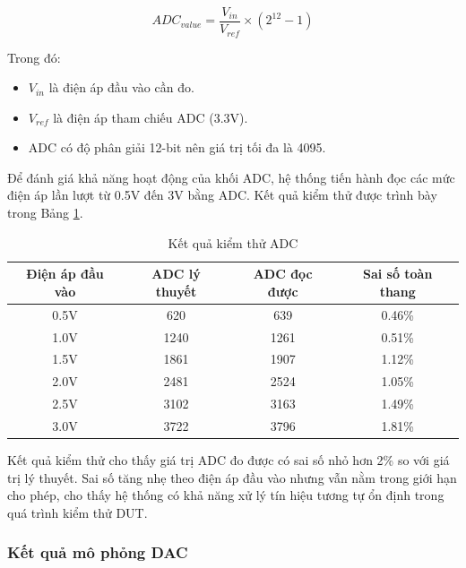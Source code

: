 \[
ADC_{value} = \frac{V_{in}}{V_{ref}} \times (2^{12}-1)
\]

Trong đó:

\begin{itemize}
    \item $V_{in}$ là điện áp đầu vào cần đo.
    \item $V_{ref}$ là điện áp tham chiếu ADC (3.3V).
    \item ADC có độ phân giải 12-bit nên giá trị tối đa là 4095.
\end{itemize}

Để đánh giá khả năng hoạt động của khối ADC, hệ thống tiến hành đọc các mức điện áp lần lượt từ 0.5V đến 3V bằng ADC. Kết quả kiểm thử được trình bày trong Bảng \ref{tab:adc_test_result}.

\begin{table}[H]
\centering
\caption{Kết quả kiểm thử ADC}
\label{tab:adc_test_result}
\renewcommand{\arraystretch}{1.2}

\begin{tabular}{|c|c|c|c|}
\hline
\textbf{Điện áp đầu vào} & \textbf{ADC lý thuyết} & \textbf{ADC đọc được} & \textbf{Sai số toàn thang} \\
\hline

0.5V & 620  & 639  & 0.46\% \\
\hline

1.0V & 1240 & 1261 & 0.51\% \\
\hline

1.5V & 1861 & 1907 & 1.12\% \\
\hline

2.0V & 2481 & 2524 & 1.05\% \\
\hline

2.5V & 3102 & 3163 & 1.49\% \\
\hline

3.0V & 3722 & 3796 & 1.81\% \\
\hline

\end{tabular}
\end{table}

Kết quả kiểm thử cho thấy giá trị ADC đo được có sai số nhỏ hơn 2\% so với giá trị lý thuyết. Sai số tăng nhẹ theo điện áp đầu vào nhưng vẫn nằm trong giới hạn cho phép, cho thấy hệ thống có khả năng xử lý tín hiệu tương tự ổn định trong quá trình kiểm thử DUT.

\subsubsection{Kết quả mô phỏng DAC}


